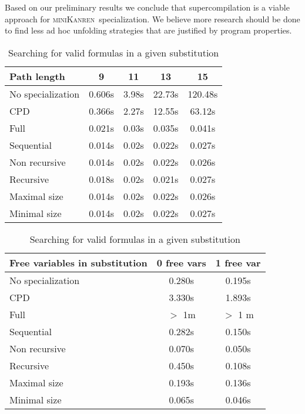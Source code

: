 \documentclass[submission,copyright,creativecommons]{eptcs}
\newcommand{\miniKanren}{\textsc{miniKanren}\ }
\begin{document}
Based on our preliminary results we conclude that supercompilation is a viable approach for \miniKanren specialization.
We believe more research should be done to find less ad hoc unfolding strategies that are justified by program properties.

%
\begin{table}[!h]
\small
\begin{minipage}[t]{.4\textwidth}
\begin{tabular}{|l|c|c|c|c|}
\hline
Path length & 9 & 11 & 13 & 15 \\ \hline
\hline
No specialization      & 0.606s & 3.98s & 22.73s & 120.48s \\
CPD          & 0.366s & 2.27s & 12.55s & 63.12s \\ \hline
Full         & 0.021s & 0.03s & 0.035s & 0.041s \\
Sequential   & 0.014s & 0.02s & 0.022s & 0.027s \\
Non recursive& 0.014s & 0.02s & 0.022s & 0.026s \\
Recursive    & 0.018s & 0.02s & 0.021s & 0.027s \\
Maximal size & 0.014s & 0.02s & 0.022s & 0.026s \\
Minimal size & 0.014s & 0.02s & 0.022s & 0.027s \\
\hline
\end{tabular}
\caption{Searching for paths in $K_{10}$.}
\label{tab:paths}
\end{minipage}
\qquad
\qquad
\qquad
\quad
\begin{minipage}[t]{.4\textwidth}
\begin{tabular}{|p{3cm}|c|c|}
\hline
Free variables in substitution & 0 free vars & 1 free var  \\ \hline
\hline
No specialization       & 0.280s & 0.195s  \\
CPD           & 3.330s & 1.893s  \\
\hline
Full          & $>$ 1m   & $>$ 1 m  \\
Sequential    & 0.282s & 0.150s \\
Non recursive & 0.070s & 0.050s \\
Recursive     & 0.450s & 0.108s \\
Maximal size  & 0.193s & 0.136s \\
Minimal size  & 0.065s & 0.046s \\
\hline
\end{tabular}
\caption{Searching for valid formulas in a given substitution}
\label{tab:logic}
\end{minipage}
\end{table}


\end{document}
